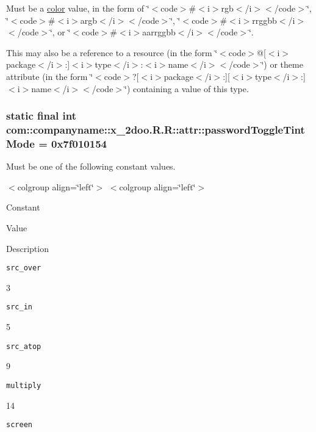 Must be a \hyperlink{classcom_1_1companyname_1_1x__2doo_1_1_r_1_1color}{color} value, in the form of \char`\"{}$<$code$>$\#$<$i$>$rgb$<$/i$>$$<$/code$>$\char`\"{}, \char`\"{}$<$code$>$\#$<$i$>$argb$<$/i$>$$<$/code$>$\char`\"{}, \char`\"{}$<$code$>$\#$<$i$>$rrggbb$<$/i$>$$<$/code$>$\char`\"{}, or \char`\"{}$<$code$>$\#$<$i$>$aarrggbb$<$/i$>$$<$/code$>$\char`\"{}. 

This may also be a reference to a resource (in the form \char`\"{}$<$code$>$@\mbox{[}$<$i$>$package$<$/i$>$:\mbox{]}$<$i$>$type$<$/i$>$:$<$i$>$name$<$/i$>$$<$/code$>$\char`\"{}) or theme attribute (in the form \char`\"{}$<$code$>$?\mbox{[}$<$i$>$package$<$/i$>$:\mbox{]}\mbox{[}$<$i$>$type$<$/i$>$:\mbox{]}$<$i$>$name$<$/i$>$$<$/code$>$\char`\"{}) containing a value of this type. \hypertarget{classcom_1_1companyname_1_1x__2doo_1_1_r_1_1attr_930a88adb866b21f54f34838092a7d4f}{
\subsubsection[{passwordToggleTintMode}]{\setlength{\rightskip}{0pt plus 5cm}static final int com::companyname::x\_\-2doo.R.R::attr::passwordToggleTintMode = 0x7f010154}}
\label{classcom_1_1companyname_1_1x__2doo_1_1_r_1_1attr_930a88adb866b21f54f34838092a7d4f}


Must be one of the following constant values. \begin{TabularC}{0}
\hline
\end{TabularC}
$<$colgroup align=\char`\"{}left\char`\"{}$>$ $<$colgroup align=\char`\"{}left\char`\"{}$>$ 

Constant

Value

Description 

{\tt src\_\-over}

3

{\tt src\_\-in}

5

{\tt src\_\-atop}

9

{\tt multiply}

14

{\tt screen}

